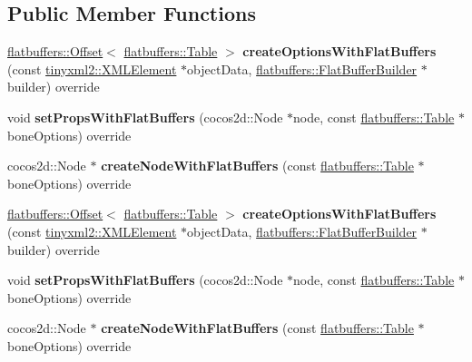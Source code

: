 \subsection*{Public Member Functions}
\begin{DoxyCompactItemize}
\item 
\mbox{\label{classBoneNodeReader_a80e2410a7397fd1f6766b00ecbc06b1c}} 
\hyperlink{structflatbuffers_1_1Offset}{flatbuffers\+::\+Offset}$<$ \hyperlink{classflatbuffers_1_1Table}{flatbuffers\+::\+Table} $>$ {\bfseries create\+Options\+With\+Flat\+Buffers} (const \hyperlink{classtinyxml2_1_1XMLElement}{tinyxml2\+::\+X\+M\+L\+Element} $\ast$object\+Data, \hyperlink{classflatbuffers_1_1FlatBufferBuilder}{flatbuffers\+::\+Flat\+Buffer\+Builder} $\ast$builder) override
\item 
\mbox{\label{classBoneNodeReader_a6324f0609aba725fb5db16b4cc339083}} 
void {\bfseries set\+Props\+With\+Flat\+Buffers} (cocos2d\+::\+Node $\ast$node, const \hyperlink{classflatbuffers_1_1Table}{flatbuffers\+::\+Table} $\ast$bone\+Options) override
\item 
\mbox{\label{classBoneNodeReader_acf46d9361af2d31eb80bc7783d74368f}} 
cocos2d\+::\+Node $\ast$ {\bfseries create\+Node\+With\+Flat\+Buffers} (const \hyperlink{classflatbuffers_1_1Table}{flatbuffers\+::\+Table} $\ast$bone\+Options) override
\item 
\mbox{\label{classBoneNodeReader_a6a17cd230f2d66c59f14b86859d831c9}} 
\hyperlink{structflatbuffers_1_1Offset}{flatbuffers\+::\+Offset}$<$ \hyperlink{classflatbuffers_1_1Table}{flatbuffers\+::\+Table} $>$ {\bfseries create\+Options\+With\+Flat\+Buffers} (const \hyperlink{classtinyxml2_1_1XMLElement}{tinyxml2\+::\+X\+M\+L\+Element} $\ast$object\+Data, \hyperlink{classflatbuffers_1_1FlatBufferBuilder}{flatbuffers\+::\+Flat\+Buffer\+Builder} $\ast$builder) override
\item 
\mbox{\label{classBoneNodeReader_a6324f0609aba725fb5db16b4cc339083}} 
void {\bfseries set\+Props\+With\+Flat\+Buffers} (cocos2d\+::\+Node $\ast$node, const \hyperlink{classflatbuffers_1_1Table}{flatbuffers\+::\+Table} $\ast$bone\+Options) override
\item 
\mbox{\label{classBoneNodeReader_a798ad5c18cc8937135c907e71e2068c6}} 
cocos2d\+::\+Node $\ast$ {\bfseries create\+Node\+With\+Flat\+Buffers} (const \hyperlink{classflatbuffers_1_1Table}{flatbuffers\+::\+Table} $\ast$bone\+Options) override
\end{DoxyCompactItemize}
